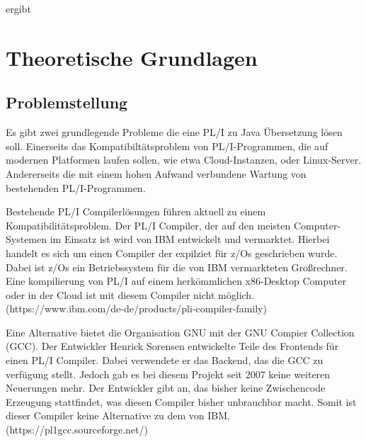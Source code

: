ergibt%





\section{Theoretische Grundlagen}
\subsection{Problemstellung}
	
Es gibt zwei grundlegende Probleme die eine PL/I zu Java Übersetzung lösen soll. 
Einerseits das Kompatibiltätsproblem von PL/I-Programmen, die auf modernen Platformen laufen sollen, wie etwa Cloud-Instanzen, oder Linux-Server. Andererseits die mit einem hohen Aufwand verbundene Wartung von bestehenden PL/I-Programmen. 
	
Bestehende PL/I Compilerlösungen führen aktuell zu einem Kompatibilitätsproblem. Der PL/I Compiler, der auf den meisten Computer-Systemen im Einsatz ist wird von IBM entwickelt und vermarktet. Hierbei handelt es sich um einen Compiler der expilziet für z/Os geschrieben wurde. Dabei ist z/Os ein Betriebssystem für die von IBM vermarkteten Großrechner. Eine kompilierung von PL/I auf einem herkömmlichen x86-Desktop Computer oder in der Cloud ist mit diesem Compiler nicht möglich. 
(https://www.ibm.com/de-de/products/pli-compiler-family) 

Eine Alternative bietet die Organisation GNU mit der GNU Compier Collection (GCC). Der Entwickler Henrick Sorensen entwickelte Teile des Frontends für einen PL/I Compiler. Dabei verwendete er das Backend, das die GCC zu verfügung stellt. Jedoch gab es bei diesem Projekt seit 2007 keine weiteren Neuerungen mehr. Der Entwickler gibt an, das bisher keine Zwischencode Erzeugung stattfindet, was diesen Compiler bisher unbrauchbar macht. Somit ist dieser Compiler keine Alternative zu dem von IBM.
(https://pl1gcc.sourceforge.net/) 

